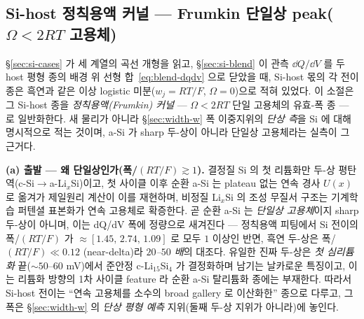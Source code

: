 \subsection{Si-host 정칙용액 커널 --- Frumkin 단일상 peak($\Omega\!<\!2RT$ 고용체)}\label{ssec:si-frumkin}
\S\ref{sec:si-cases} 가 세 계열의 곡선 개형을 읽고, \S\ref{sec:si-blend} 이 관측 $\dd Q/\dd V$ 를 두 host 평형
종의 배경 위 선형 합~\eqref{eq:blend-dqdv} 으로 닫았을 때, Si-host 몫의 각 전이 종은 흑연과 같은 이상 logistic
미분($w_j\!=\!RT/F$, $\Omega\!=\!0$)으로 적혀 있었다. 이 소절은 그 Si-host 종을 \emph{정칙용액(Frumkin) 커널} ---
$\Omega\!<\!2RT$ 단일 고용체의 유효-폭 종 --- 로 일반화한다. 새 물리가 아니라 \S\ref{sec:width-w} 폭 이중지위의
\emph{단상 측}을 Si 에 대해 명시적으로 적는 것이며, a-Si 가 sharp 두-상이 아니라 단일상 고용체라는 실측이 그
근거다.

\textbf{(a) 출발 --- 왜 단일상인가(폭/$(RT/F)\!\gtrsim\!1$).} 결정질 Si 의 첫 리튬화만 두-상
평탄역(c-Si$\to$a-Li$_x$Si)이고\cite{limthongkul2003}, 첫 사이클 이후 순환 a-Si 는 plateau 없는 연속 경사 $U(x)$
로 옮겨가 제일원리 계산이 이를 재현하며\cite{chevrier_dahn2009,wang_asi2013,mcdowell_coreshell2013}, 비정질
Li$_x$Si 의 조성 무질서 구조는 기계학습 퍼텐셜 표본화가 연속 고용체로 확증한다\cite{artrith2018}. 곧 순환 a-Si
는 \emph{단일상 고용체}이지 sharp 두-상이 아니며, 이는 dQ/dV 폭에 정량으로 새겨진다 --- 정칙용액 피팅에서 Si
전이의 폭/$(RT/F)$ 가 $\approx\![1.45,\,2.74,\,1.09]$ 로 모두 $1$ 이상인 반면, 흑연 두-상은 폭/$(RT/F)\!\ll\!0.12$
(near-delta)라 \emph{$20$--$50$ 배}의 대조다. 유일한 진짜 두-상은 \emph{첫 심리튬화} 끝($\sim\!50$--$60$ mV)에서
준안정 c-Li$_{15}$Si$_4$ 가 결정화하며 남기는 날카로운 특징이고\cite{obrovac_christensen2004,ogata_nmr2014}, 이는
리튬화 방향의 1차 사이클 feature 라 순환 a-Si 탈리튬화 종에는 부재한다. 따라서 Si-host 전이는 ``연속 고용체를
소수의 broad gallery 로 이산화한'' 종으로 다루고, 그 폭은 \S\ref{sec:width-w} 의 \emph{단상 평형 예측}
지위(둘째 두-상 지위가 아니라)에 놓인다.

